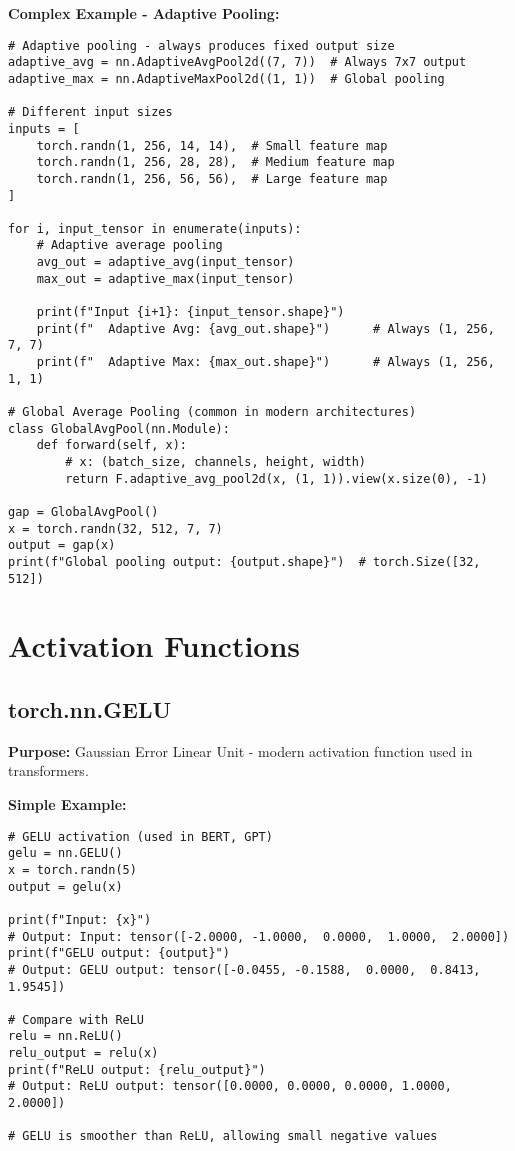 \documentclass[11pt,a4paper]{book}
\begin{document}
\textbf{Complex Example - Adaptive Pooling:}
\begin{verbatim}
# Adaptive pooling - always produces fixed output size
adaptive_avg = nn.AdaptiveAvgPool2d((7, 7))  # Always 7x7 output
adaptive_max = nn.AdaptiveMaxPool2d((1, 1))  # Global pooling

# Different input sizes
inputs = [
    torch.randn(1, 256, 14, 14),  # Small feature map
    torch.randn(1, 256, 28, 28),  # Medium feature map
    torch.randn(1, 256, 56, 56),  # Large feature map
]

for i, input_tensor in enumerate(inputs):
    # Adaptive average pooling
    avg_out = adaptive_avg(input_tensor)
    max_out = adaptive_max(input_tensor)
    
    print(f"Input {i+1}: {input_tensor.shape}")
    print(f"  Adaptive Avg: {avg_out.shape}")      # Always (1, 256, 7, 7)
    print(f"  Adaptive Max: {max_out.shape}")      # Always (1, 256, 1, 1)

# Global Average Pooling (common in modern architectures)
class GlobalAvgPool(nn.Module):
    def forward(self, x):
        # x: (batch_size, channels, height, width)
        return F.adaptive_avg_pool2d(x, (1, 1)).view(x.size(0), -1)

gap = GlobalAvgPool()
x = torch.randn(32, 512, 7, 7)
output = gap(x)
print(f"Global pooling output: {output.shape}")  # torch.Size([32, 512])
\end{verbatim}

\section{Activation Functions}

\subsection{torch.nn.GELU}

\textbf{Purpose:} Gaussian Error Linear Unit - modern activation function used in transformers.

\textbf{Simple Example:}
\begin{verbatim}
# GELU activation (used in BERT, GPT)
gelu = nn.GELU()
x = torch.randn(5)
output = gelu(x)

print(f"Input: {x}")
# Output: Input: tensor([-2.0000, -1.0000,  0.0000,  1.0000,  2.0000])
print(f"GELU output: {output}")
# Output: GELU output: tensor([-0.0455, -0.1588,  0.0000,  0.8413,  1.9545])

# Compare with ReLU
relu = nn.ReLU()
relu_output = relu(x)
print(f"ReLU output: {relu_output}")
# Output: ReLU output: tensor([0.0000, 0.0000, 0.0000, 1.0000, 2.0000])

# GELU is smoother than ReLU, allowing small negative values
\end{verbatim}
\end{document}
